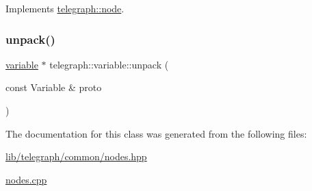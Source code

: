 Implements \hyperlink{classtelegraph_1_1node_a5006b21e9b83ecd52f3f953a1b828773}{telegraph\+::node}.

\mbox{\label{classtelegraph_1_1variable_aeea48695245eddd386bcc44719111ff2}} 
\subsubsection{\texorpdfstring{unpack()}{unpack()}}
{\footnotesize\ttfamily \hyperlink{classtelegraph_1_1variable}{variable} $\ast$ telegraph\+::variable\+::unpack (\begin{DoxyParamCaption}\item[{const Variable \&}]{proto }\end{DoxyParamCaption})\hspace{0.3cm}{\ttfamily [static]}}



The documentation for this class was generated from the following files\+:\begin{DoxyCompactItemize}
\item 
\hyperlink{lib_2telegraph_2common_2nodes_8hpp}{lib/telegraph/common/nodes.\+hpp}\item 
\hyperlink{nodes_8cpp}{nodes.\+cpp}\end{DoxyCompactItemize}
